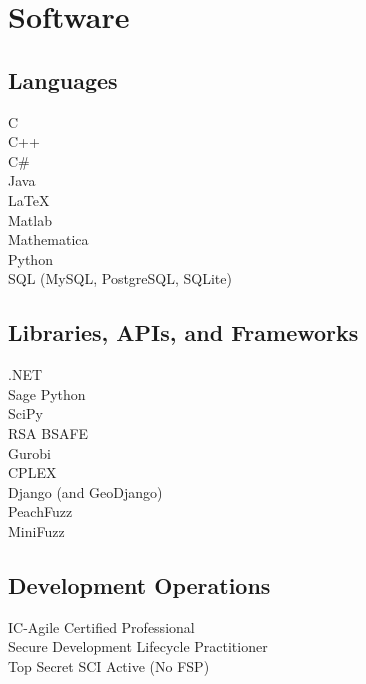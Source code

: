 \documentclass[letterpaper]{deedy-resume} %
\begin{document}
\begin{minipage}[t]{0.33\textwidth}
\sectionspace %


\section{Software}

\subsection{Languages}

C\\
C++\\
C\#\\
Java\\
\LaTeX\\
Matlab\\
Mathematica\\
Python\\
SQL (MySQL, PostgreSQL, SQLite)\\


\sectionspace %


\subsection{Libraries, APIs, and Frameworks}

.NET\\
Sage Python\\
SciPy\\
RSA BSAFE\\
Gurobi\\
CPLEX\\
Django (and GeoDjango)\\
PeachFuzz\\
MiniFuzz\\
\subsection{Development Operations}

IC-Agile Certified Professional\\
Secure Development Lifecycle Practitioner\\
Top Secret SCI Active (No FSP)\\

\sectionspace %


\end{minipage}
\end{document}
